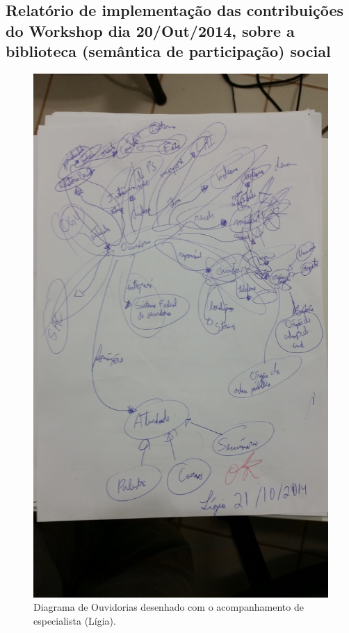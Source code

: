 \documentclass[12pt]{article}
\begin{document}
\subsection{Relatório de implementação das contribuições do Workshop dia 20/Out/2014, sobre a biblioteca (semântica de participação) social}
\begin{figure}[h!]
  \centering
    \includegraphics[width=\textwidth,angle=270]{fotos/OuvidoriaLigia.jpg}
  \caption{Diagrama de Ouvidorias desenhado com o acompanhamento de especialista (Lígia).}
\end{figure}
\end{document}
